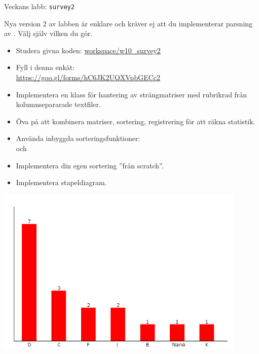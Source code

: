 

\ifkompendium\else

\begin{Slide}{Veckans labb: \texttt{survey2}}\SlideFontTiny
\begin{minipage}{0.65\textwidth}
Nya version 2 av labben är enklare och kräver ej att du implementerar parsning av . Välj själv vilken du gör.

\vspace{0.5em}
\begin{itemize}
\item Studera givna koden: {\SlideFontTiny \href{https://github.com/lunduniversity/introprog/tree/master/workspace/w10_survey2/src/main/scala/stats}{workspace/w10\_survey2}}
\item Fyll i denna enkät:
\\{\SlideFontTiny \url{https://goo.gl/forms/hC6JK2UQXVpbGECc2}} 
\end{itemize}

\begin{itemize}
\item Implementera en klass  för hantering av strängmatriser med rubrikrad från kolumnsepararade textfiler.
\item Öva på att kombinera matriser, sortering, registrering för att räkna statistik.
\item Använda inbyggda sorteringsfunktioner: \\ och 
\item Implementera din egen sortering ''från scratch''.
\end{itemize}
\begin{itemize}
\item Implementera stapeldiagram.
\end{itemize}
\end{minipage}
\hfill\begin{minipage}{0.27\textwidth}
\centering
\includegraphics[width=0.9\textwidth]{../img/survey/bar}


\end{minipage}
\end{Slide}
